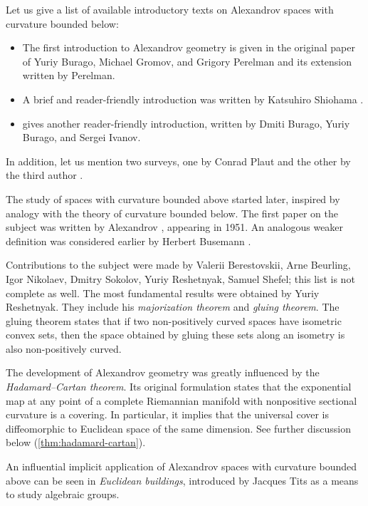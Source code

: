 %
Let us give a list of available introductory texts on Alexandrov spaces with curvature bounded below: 
\begin{itemize}
\item The first introduction to Alexandrov geometry is given in the original paper of Yuriy Burago, Michael Gromov, and Grigory Perelman \cite{burago-gromov-perelman} 
and its extension \cite{perelman:spaces2} written by Perelman.
\item A brief and reader-friendly introduction was written by Katsuhiro Shiohama \cite[Sections 1--8]{shiohama}.
\item \cite[Chapter 10]{burago-burago-ivanov} gives another reader-friendly introduction, written by Dmiti Burago, Yuriy Burago, and Sergei Ivanov.
\end{itemize}
In addition, let us mention two surveys, one by Conrad Plaut \cite{plaut:survey} and the other by the third author \cite{petrunin:survey}.

{\sloppy

The study of  spaces with curvature bounded above started later,
inspired by analogy with the theory of curvature bounded below.
The first paper on the subject was written by Alexandrov \cite{alexandrov:strong-angle}, appearing in 1951.
An analogous weaker definition was considered earlier by Herbert Busemann \cite{busemann-CBA}.

}

Contributions to the subject were made by
Valerii Berestovskii, 
Arne Beurling, 
Igor Nikolaev,
Dmitry Sokolov,
Yuriy Reshetnyak,
Samuel Shefel; this list is not complete as well.
The most fundamental results were obtained by Yuriy Reshetnyak.
They include his {}\emph{majorization theorem} and {}\emph{gluing theorem}.
The gluing theorem states that if two non-positively curved spaces have isometric convex sets, then the space obtained by gluing these sets along an isometry is also non-positively curved.

The development of Alexandrov geometry was greatly influenced by the {}\emph{Hadamard--Cartan theorem}.
Its original formulation states that the exponential map at any point of a complete Riemannian manifold with nonpositive sectional curvature is a covering.
In particular, it implies that the universal cover is diffeomorphic to Euclidean space of the same dimension. 
See further discussion below (\ref{thm:hadamard-cartan}).

An influential implicit application of Alexandrov spaces with curvature bounded above can be seen in {}\emph{Euclidean buildings}, introduced by Jacques Tits as a means to study algebraic groups.


